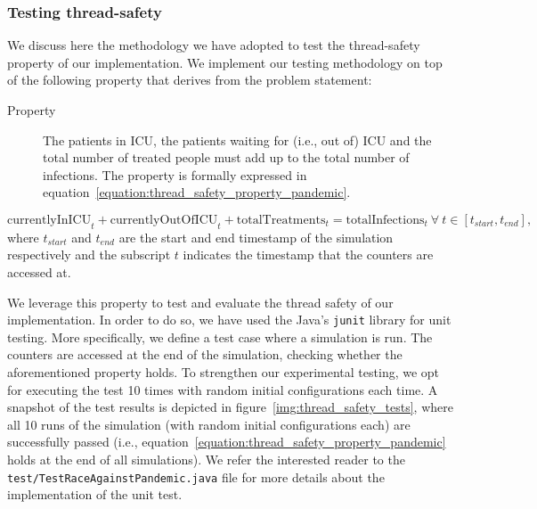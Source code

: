 \documentclass[acmlarge]{acmart}
\begin{document}
\subsubsection{Testing thread-safety}

We discuss here the methodology we have adopted to test the thread-safety property of our implementation. We implement our testing methodology on top of the following property that derives from the problem statement:
\begin{description}
  \item[Property] The patients in ICU, the patients waiting for (i.e., out of) ICU and the total number of treated people must add up to the total number of infections. The property is formally expressed in equation~\ref{equation:thread_safety_property_pandemic}.
\end{description}
\begin{equation}
  \label{equation:thread_safety_property_pandemic}
  \text{currentlyInICU}_t + \text{currentlyOutOfICU}_t + \text{totalTreatments}_t = \text{totalInfections}_t~\forall~ t \in [t_{start}, t_{end}],
\end{equation}
where $t_{start}$ and $t_{end}$ are the start and end timestamp of the simulation respectively and the subscript $t$ indicates the timestamp that the counters are accessed at.

We leverage this property to test and evaluate the thread safety of our implementation. In order to do so, we have used the Java's \texttt{junit} library for unit testing. More specifically, we define a test case where a simulation is run. The counters are accessed at the end of the simulation, checking whether the aforementioned property holds. To strengthen our experimental testing, we opt for executing the test 10 times with random initial configurations each time. A snapshot of the test results is depicted in figure~\ref{img:thread_safety_tests}, where all 10 runs of the simulation (with random initial configurations each) are successfully passed (i.e., equation~\ref{equation:thread_safety_property_pandemic} holds at the end of all simulations). We refer the interested reader to the \texttt{test/TestRaceAgainstPandemic.java} file for more details about the implementation of the unit test.
\end{document}
